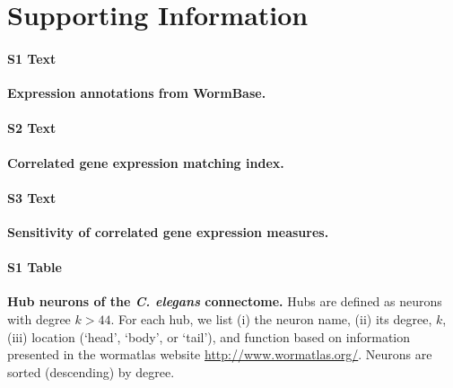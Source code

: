 \documentclass[10pt,letterpaper]{article}
\begin{document}
{%




\newpage
\section*{Supporting Information}
\setcounter{figure}{0} \renewcommand{\thefigure}{S\arabic{figure}}
\renewcommand{\thefigure}{S\arabic{figure}}
\renewcommand{\thetable}{S\arabic{table}}

\paragraph*{S1 Text}
\label{text:expressionAnnotations}
{\bf Expression annotations from WormBase.} 

\paragraph*{S2 Text}
\label{text:matchingIndex}
{\bf Correlated gene expression matching index.} 

\paragraph*{S3 Text}
\label{text:coexprSensitivity}
{\bf Sensitivity of correlated gene expression measures.} 

\clearpage

\paragraph*{S1 Table}
\label{tab:HubList}
{\bf Hub neurons of the \textit{C. elegans} connectome.} Hubs are defined as neurons with degree $k > 44$.
For each hub, we list (i) the neuron name, (ii) its degree, $k$, (iii) location (`head', `body', or `tail'), and function based on information presented in the wormatlas website \url{http://www.wormatlas.org/}.
Neurons are sorted (descending) by degree.}
\end{document}
